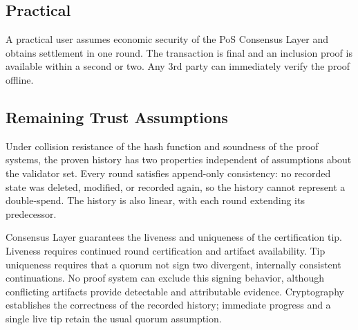 \subsection{Practical}

A practical user assumes economic security of the PoS Consensus Layer and obtains settlement in one round. The transaction is final and an inclusion proof is available within a second or two. Any 3rd party can immediately verify the proof offline.

\subsection{Remaining Trust Assumptions}

Under collision resistance of the hash function and soundness of the proof systems, the proven history has two properties independent of assumptions about the validator set. Every round satisfies append-only consistency: no recorded state was deleted, modified, or recorded again, so the history cannot represent a double-spend. The history is also linear, with each round extending its predecessor.

Consensus Layer guarantees the liveness and uniqueness of the certification tip. Liveness requires continued round certification and artifact availability. Tip uniqueness requires that a quorum not sign two divergent, internally consistent continuations. No proof system can exclude this signing behavior, although conflicting artifacts provide detectable and attributable evidence. Cryptography establishes the correctness of the recorded history; immediate progress and a single live tip retain the usual quorum assumption.
